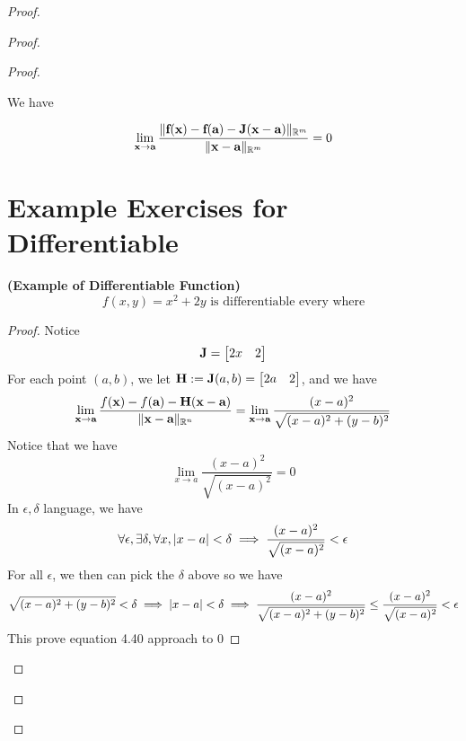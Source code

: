 \documentclass{report}
\begin{document}
\begin{proof}
\begin{proof}
\begin{proof}
\begin{theorem}
We have

\begin{equation}
\lim_{\textbf{x}\to \textbf{a}}\frac{\| \textbf{f}(\textbf{x})-\textbf{f}(\textbf{a})-\textbf{J}(\textbf{x}-\textbf{a}) \|_{\mathbb{R}^m}}{\| \textbf{x}-\textbf{a} \|_{\mathbb{R}^m}}=0
\end{equation}
\end{theorem}
\section{Example Exercises for Differentiable}
\begin{theorem}
\label{6.3.1}
\textbf{(Example of Differentiable Function)} 
\begin{equation}
f(x,y)=x^2+2y\text{ is differentiable every where}
\end{equation}
\end{theorem}
\begin{proof}
Notice 
\begin{equation}
\textbf{J}=\begin{bmatrix}
  2x&2
\end{bmatrix}
\end{equation}
For each point $(a,b)$, we let $\textbf{H}:=\textbf{J}(a,b)=\begin{bmatrix}
  2a&2
\end{bmatrix}$, and we have
\begin{equation}
\lim_{\textbf{x}\to \textbf{a}}\frac{f(\textbf{x})-f(\textbf{a})-\textbf{H}(\textbf{x}-\textbf{a})}{\| \textbf{x}-\textbf{a} \|_{\mathbb{R}^n}}=\lim_{\textbf{x}\to \textbf{a}}\frac{(x-a)^2}{\sqrt{(x-a)^2+(y-b)^2}}
\end{equation}
Notice that we have
\begin{equation}
\lim_{x\to a}\frac{(x-a)^2}{\sqrt{(x-a)^2} }=0
\end{equation}
In $\epsilon,\delta$ language, we have
\begin{equation}
\forall \epsilon,\exists \delta, \forall x, |x-a|<\delta \implies \frac{(x-a)^2}{\sqrt{(x-a)^2} }<\epsilon  
\end{equation}
For all $\epsilon $, we then can pick the $\delta$ above so we have
\begin{equation}
\sqrt{(x-a)^2+(y-b)^2}<\delta \implies |x-a|<\delta\implies \frac{(x-a)^2}{\sqrt{(x-a)^2+(y-b)^2} }\leq  \frac{(x-a)^2}{\sqrt{(x-a)^2} } <\epsilon 
\end{equation}
This prove equation 4.40 approach to 0
\end{proof}
\begin{theorem}

\end{theorem}
\end{proof}
\end{proof}
\end{proof}
\end{document}
